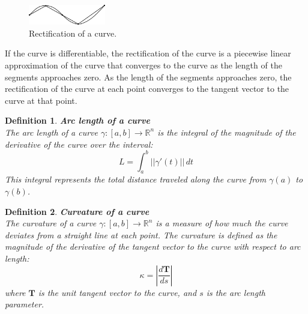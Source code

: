 \documentclass[11pt]{book} %
\newtheorem{definition}{Definition}[section]
\begin{document}
\begin{figure}[H]
    \centering
    \includegraphics[width=0.3\textwidth]{./figs/Arclength.png}
    \caption{Rectification of a curve.}
\end{figure}

If the curve is differentiable, the rectification of the curve is a piecewise linear approximation of the curve that converges 
to the curve as the length of the segments approaches zero. 
As the length of the segments approaches zero, the rectification of the curve at each point converges to the tangent vector to the curve at that point.

\begin{definition}{\textbf{Arc length of a curve}} \\
    The arc length of a curve \( \gamma: [a, b] \to \mathbb{R}^n \) is the integral of the magnitude of the derivative of the curve over the interval:
    \[
    L = \int_{a}^{b} ||\gamma'(t)|| \, dt
    \]
    This integral represents the total distance traveled along the curve from \( \gamma(a) \) to \( \gamma(b) \).
\end{definition}


\begin{definition}{\textbf{Curvature of a curve}} \\
    The curvature of a curve \( \gamma: [a, b] \to \mathbb{R}^n \) is a measure of how much the curve deviates from a straight line at each point.
    The curvature is defined as the magnitude of the derivative of the tangent vector to the curve with respect to arc length:
    \[
    \kappa = \left|\frac{d\mathbf{T}}{ds}\right|
    \]
    where \( \mathbf{T} \) is the unit tangent vector to the curve, and \( s \) is the arc length parameter.
\end{definition}






\end{document}
